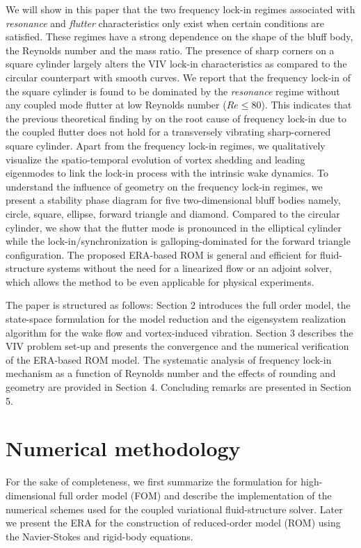 \documentclass{jfm}
\begin{document}
%
We will show in this paper that the two frequency lock-in regimes associated 
with \emph{resonance} and \emph{flutter} characteristics 
only exist when certain conditions are satisfied. These regimes 
have a strong dependence on the shape of the bluff body, the Reynolds number and the mass ratio.
The presence of sharp corners on a square cylinder largely alters the VIV lock-in
characteristics as compared to the circular counterpart with smooth curves.
%
We report that the frequency lock-in of the square cylinder 
is found to be dominated by the \emph{resonance} regime without any coupled mode 
flutter at low Reynolds number ($Re \le 80$). This indicates that the previous theoretical finding by \cite{DeLangre2006} on the root cause of frequency lock-in due to
the coupled flutter does not hold for a transversely vibrating sharp-cornered square cylinder.
%
Apart from the frequency lock-in regimes, we qualitatively 
visualize the spatio-temporal evolution of vortex shedding and leading eigenmodes 
to link the lock-in process with the intrinsic wake dynamics.
To understand the influence of geometry on the frequency lock-in regimes,
we present a stability phase diagram for five two-dimensional bluff bodies 
namely, circle, square, ellipse, forward triangle and diamond.
%
Compared to the circular cylinder, we show that the flutter mode is pronounced in the elliptical cylinder  
while the lock-in/synchronization is galloping-dominated for the forward triangle configuration.
%
The proposed ERA-based ROM is general and efficient for 
fluid-structure systems without the need for a linearized flow or an adjoint solver, 
which allows the method to be even applicable for physical experiments. 

%
The paper is structured as follows: Section 2 introduces the full order model, the 
state-space formulation for the model reduction and 
the eigensystem realization algorithm for the wake flow and vortex-induced vibration.
Section 3 describes the VIV problem set-up and presents the convergence and  
the numerical verification of the ERA-based ROM model. 
The systematic analysis of frequency lock-in mechanism 
as a function of Reynolds number and the effects of rounding and geometry are provided in Section 4. 
Concluding remarks are presented in Section 5. 

\section{Numerical methodology}\label{sec:method}
For the sake of completeness, we first summarize the formulation for high-dimensional 
full order model (FOM) 
and describe the implementation of the numerical schemes used for the coupled variational fluid-structure solver. 
Later we present the ERA 
for the construction of reduced-order model (ROM) using the Navier-Stokes 
and rigid-body equations.
\end{document}
